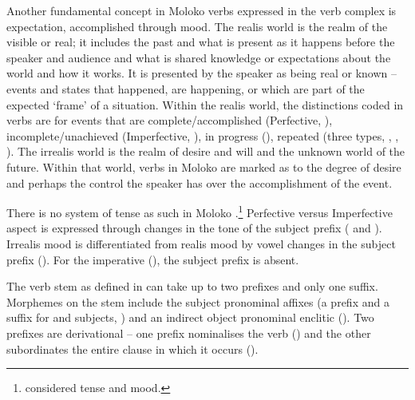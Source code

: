 \largerpage
Another fundamental concept in Moloko verbs expressed in the verb complex is expectation, accomplished through mood. The realis world is the realm of the visible or real; it includes the past and what is present as it happens before the speaker and audience and what is shared knowledge or expectations about the world and how it works. It is presented by the speaker as being real or known -- events and states that happened, are happening, or which are part of the expected ‘frame’ of a situation. Within the realis world, the distinctions coded in verbs are for events that are complete/accomplished (Perfective, ), incomplete/unachieved (Imperfective, ), in progress (), repeated (three types, , , ). The irrealis world is the realm of desire and will and the unknown world of the future. Within that world, verbs in Moloko are marked as to the degree of desire and perhaps the control the speaker has over the accomplishment of the event.

There is no system of tense as such in Moloko \citep{FriesenMamalis2008}.\footnote{\citet{Bow1997c} considered tense and mood.} Perfective versus Imperfective aspect is expressed through changes in the tone of the subject prefix ( and ). Irrealis mood is differentiated from realis mood by vowel changes in the subject prefix (). For the imperative (), the subject prefix is absent.  

The verb stem as defined in  can take up to two prefixes and only one suffix.  Morphemes on the stem include the subject pronominal affixes (a prefix and a suffix for {\oneP} and {\twoP} subjects, ) and an indirect object pronominal enclitic (). Two prefixes are derivational -- one prefix nominalises the verb () and the other subordinates the entire clause in which it occurs (). 

